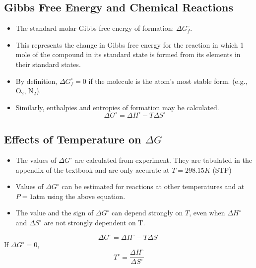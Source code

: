 \documentclass[10pt]{article}
\begin{document}
\subsection*{Gibbs Free Energy and Chemical Reactions}
\begin{itemize}
    \item The standard molar Gibbs free energy of formation: $\Delta G_f^\circ$.
    \item This represents the change in Gibbs free energy for the reaction in which 1 mole of the compound in its standard state is formed from its elements in their standard states.
    \item By definition, $\Delta G_f^\circ = 0$ if the molecule is the atom's most stable form. (e.g., O$_2$, N$_2$).
    \item Similarly, enthalpies and entropies of formation may be calculated.
    \[\Delta G^\circ = \Delta H^\circ - T \Delta S^\circ\]
\end{itemize}


\subsection*{Effects of Temperature on $\Delta G$}
\begin{itemize}
    \item The values of $\Delta G^\circ$ are calculated from experiment.  They are tabulated in the appendix of the textbook and are only accurate at $T = 298.15K$ (STP)
    \item Values of $\Delta G^\circ$ can be estimated for reactions at other temperatures and at $P = 1$atm using the above equation.
    \item The value and the sign of $\Delta G^\circ$ can depend strongly on $T$, even when $\Delta H^\circ$ and $\Delta S^\circ$ are not strongly dependent on T.
\end{itemize}
\[\Delta G^\circ = \Delta H^\circ - T \Delta S^\circ\]
If $\Delta G^\circ = 0$,
\[T^\circ = \frac{\Delta H^\circ}{\Delta S^\circ}\]
\end{document}
